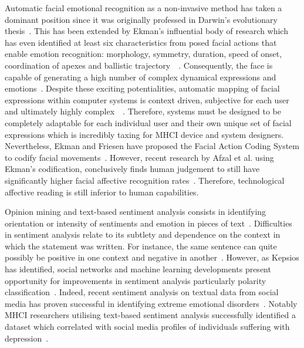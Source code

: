 \documentclass{sigchi}
\begin{document}
Automatic facial emotional recognition as a non-invasive method has taken a dominant position since it was originally professed in Darwin’s evolutionary thesis~\cite{hess2009darwin}. This has been extended by Ekman’s influential body of research which has even identified at least six characteristics from posed facial actions that enable emotion recognition: morphology, symmetry, duration, speed of onset, coordination of apexes and ballistic trajectory~\cite{ekman1992facial}~\cite{keltner2003facial}. Consequently, the face is capable of generating a high number of complex dynamical expressions and emotions~\cite{donato1999classifying}. Despite these exciting potentialities, automatic mapping of facial expressions within computer systems is context driven, subjective for each user and ultimately highly complex~\cite{bartlett1999measuring}~\cite{tian2005facial}. Therefore, systems must be designed to be completely adaptable for each individual user and their own unique set of facial expressions which is incredibly taxing for MHCI device and system designers. Nevertheless, Ekman and Friesen have proposed the Facial Action Coding System to codify facial movements~\cite{cohn2007observer}. However, recent research by Afzal et al. using Ekman’s codification, conclusively finds human judgement to still have significantly higher facial affective recognition rates~\cite{afzal2009perception}. Therefore, technological affective reading is still inferior to human capabilities.  

Opinion mining and text-based sentiment analysis consists in identifying orientation or intensity of sentiments and emotion in pieces of text~\cite{nicolaou2012output}. Difficulties in sentiment analysis relate to its subtlety and dependence on the context in which the statement was written. For instance, the same sentence can quite possibly be positive in one context and negative in another~\cite{marechal2019survey}. However, as Kepsios has identified, social networks and machine learning developments present opportunity for improvements in sentiment analysis particularly polarity classification~\cite{trigeorgis2016adieu}. Indeed, recent sentiment analysis on textual data from social media has proven successful in identifying extreme emotional disorders~\cite{sharma2019automated}. Notably MHCI researchers utilising text-based sentiment analysis successfully identified a dataset which correlated with social media profiles of individuals suffering with depression~\cite{de2013predicting}.
\end{document}
